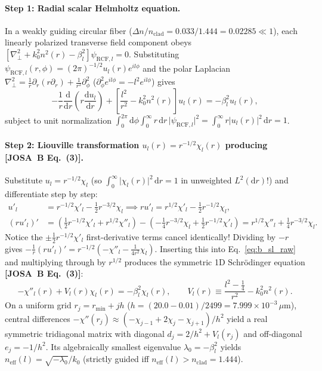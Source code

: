 \documentclass[10pt,letterpaper]{article}
\newcommand{\abs}[1]{\lvert #1 \rvert}
\newcommand{\dd}{\mathrm{d}}
\newcommand{\josb}[1]{\textbf{[JOSA~B Eq.~(#1)]}}
\numberwithin{equation}{section}
\begin{document}
\paragraph*{Step 1: Radial scalar Helmholtz equation.}
In a weakly guiding circular fiber ($\Delta n/n_{\mathrm{clad}} = 0.033/1.444 = 0.02285 \ll 1$), each linearly polarized transverse field component obeys $[\nabla_\perp^2 + k_0^2 n^2(r) - \beta_l^2]\psi_{\mathrm{RCF},l} = 0$. Substituting $\psi_{\mathrm{RCF},l}(r,\phi) = (2\pi)^{-1/2} u_l(r) e^{il\phi}$ and the polar Laplacian $\nabla_\perp^2 = \frac{1}{r}\partial_r(r\partial_r) + \frac{1}{r^2}\partial_\phi^2$ ($\partial_\phi^2 e^{il\phi} = -l^2 e^{il\phi}$) gives
\begin{equation}
  -\frac{1}{r}\frac{\dd}{\dd r}\!\left(r\frac{\dd u_l}{\dd r}\right) + \left[\frac{l^2}{r^2} - k_0^2 n^2(r)\right] u_l(r) = -\beta_l^2 u_l(r),
  \label{eq:b_sl_raw}
\end{equation}
subject to unit normalization $\int_0^{2\pi}\dd\phi\int_0^\infty r\,\dd r\,\abs{\psi_{\mathrm{RCF},l}}^2 = \int_0^\infty r\abs{u_l(r)}^2\,\dd r = 1$.

\paragraph*{Step 2: Liouville transformation $u_l(r) = r^{-1/2}\chi_l(r)$ producing \josb{3}.}
Substitute $u_l = r^{-1/2}\chi_l$ (so $\int_0^\infty \abs{\chi_l(r)}^2\,\dd r = 1$ in unweighted $L^2(\dd r)$!) and differentiate step by step:
\begin{align}
  u'_l &= r^{-1/2}\chi'_l - \frac{1}{2}r^{-3/2}\chi_l \implies r u'_l = r^{1/2}\chi'_l - \frac{1}{2}r^{-1/2}\chi_l, \\
  (r u'_l)' &= \left(\frac{1}{2}r^{-1/2}\chi'_l + r^{1/2}\chi''_l\right) - \left(-\frac{1}{4}r^{-3/2}\chi_l + \frac{1}{2}r^{-1/2}\chi'_l\right) = r^{1/2}\chi''_l + \frac{1}{4}r^{-3/2}\chi_l.
\end{align}
Notice the $\pm\frac{1}{2}r^{-1/2}\chi'_l$ first-derivative terms cancel identically! Dividing by $-r$ gives $-\frac{1}{r}(r u'_l)' = r^{-1/2}(-\chi''_l - \frac{1}{4r^2}\chi_l)$. Inserting this into Eq.~\eqref{eq:b_sl_raw} and multiplying through by $r^{1/2}$ produces the symmetric 1D Schr\"odinger equation \josb{3}:
\begin{equation}
  -\chi''_l(r) + V_l(r)\chi_l(r) = -\beta_l^2\chi_l(r), \qquad V_l(r) \equiv \frac{l^2 - \frac{1}{4}}{r^2} - k_0^2 n^2(r).
\end{equation}
On a uniform grid $r_j = r_{\min} + j h$ ($h = (20.0 - 0.01)/2499 = 7.999\times 10^{-3}\,\mu\mathrm{m}$), central differences $-\chi''(r_j) \approx (-\chi_{j-1} + 2\chi_j - \chi_{j+1})/h^2$ yield a real symmetric tridiagonal matrix with diagonal $d_j = 2/h^2 + V_l(r_j)$ and off-diagonal $e_j = -1/h^2$. Its algebraically smallest eigenvalue $\lambda_0 = -\beta_l^2$ yields $n_{\mathrm{eff}}(l) = \sqrt{-\lambda_0}/k_0$ (strictly guided iff $n_{\mathrm{eff}}(l) > n_{\mathrm{clad}} = 1.444$).
\end{document}
